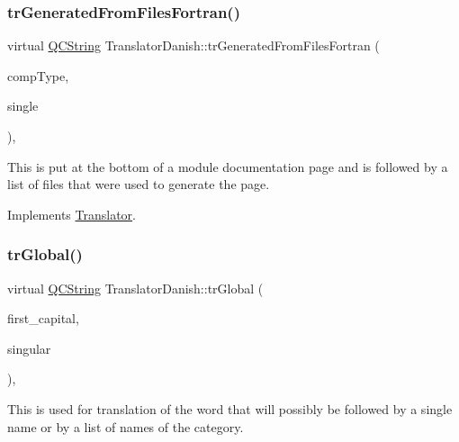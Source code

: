 \mbox{\label{class_translator_danish_a9112914f46dc2688ba460797d08c9793}} 
\subsubsection{\texorpdfstring{trGeneratedFromFilesFortran()}{trGeneratedFromFilesFortran()}}
{\footnotesize\ttfamily virtual \mbox{\hyperlink{class_q_c_string}{Q\+C\+String}} Translator\+Danish\+::tr\+Generated\+From\+Files\+Fortran (\begin{DoxyParamCaption}\item[{\mbox{\hyperlink{class_class_def_ae70cf86d35fe954a94c566fbcfc87939}{Class\+Def\+::\+Compound\+Type}}}]{comp\+Type,  }\item[{bool}]{single }\end{DoxyParamCaption})\hspace{0.3cm}{\ttfamily [inline]}, {\ttfamily [virtual]}}

This is put at the bottom of a module documentation page and is followed by a list of files that were used to generate the page. 

Implements \mbox{\hyperlink{class_translator}{Translator}}.

\mbox{\label{class_translator_danish_a2e8422aabc8b6384f3290e559a21b5a9}} 
\subsubsection{\texorpdfstring{trGlobal()}{trGlobal()}}
{\footnotesize\ttfamily virtual \mbox{\hyperlink{class_q_c_string}{Q\+C\+String}} Translator\+Danish\+::tr\+Global (\begin{DoxyParamCaption}\item[{bool}]{first\+\_\+capital,  }\item[{bool}]{singular }\end{DoxyParamCaption})\hspace{0.3cm}{\ttfamily [inline]}, {\ttfamily [virtual]}}

This is used for translation of the word that will possibly be followed by a single name or by a list of names of the category. 

